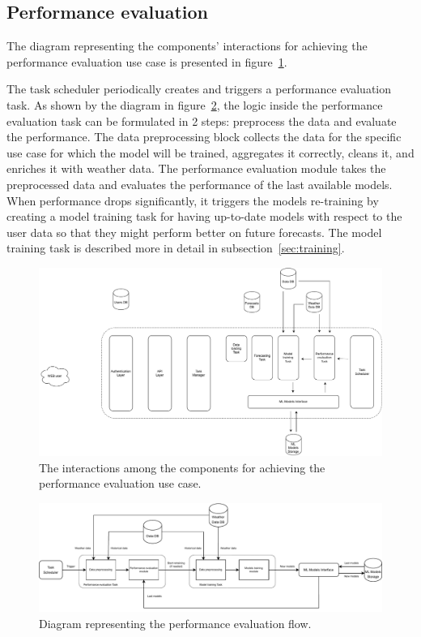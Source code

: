 \vspace{0.1 cm}
\subsection{Performance evaluation}
\label{sec:scheduler}
\vspace{0.1 cm}

The diagram representing the components' interactions for achieving the performance evaluation use case is presented in figure~\ref{fig:schedulerinteractions}.

The task scheduler periodically creates and triggers a performance evaluation task.
As shown by the diagram in figure~\ref{fig:schedulerflow}, the logic inside the performance evaluation task can be formulated in 2 steps: preprocess the data and evaluate the performance.
The data preprocessing block collects the data for the specific use case for which the model will be trained, aggregates it correctly, cleans it, and enriches it with weather data.
The performance evaluation module takes the preprocessed data and evaluates the performance of the last available models.
When performance drops significantly, it triggers the models re-training by creating a model training task for having up-to-date models with respect to the user data so that they might perform better on future forecasts.
The model training task is described more in detail in subsection~\ref{sec:training}.

\begin{figure}[H]
\centering
\includegraphics[width=1\textwidth]{images/architecture_scheduler_interactions}
\caption{The interactions among the components for achieving the performance evaluation use case.}
\label{fig:schedulerinteractions}
\end{figure}

\begin{figure}[H]
\centering
\includegraphics[width=1\textwidth]{images/architecture_scheduler_flow}
\caption{Diagram representing the performance evaluation flow.}
\label{fig:schedulerflow}
\end{figure}

